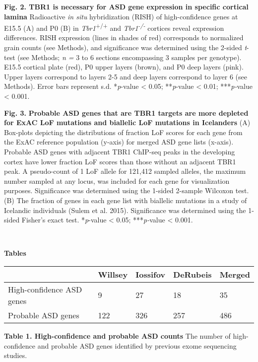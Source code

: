 \documentclass[]{article}
\begin{document}
\textbf{Fig. 2. TBR1 is necessary for ASD gene expression in specific
cortical lamina} Radioactive \emph{in situ} hybridization (RISH) of
high-confidence genes at E15.5 (A) and P0 (B) in
\emph{Tbr1}\textsuperscript{+/+} and \emph{Tbr1\textsuperscript{-/-}}
cortices reveal expression differences. RISH expression (lines in shades
of red) corresponds to normalized grain counts (see Methods), and
significance was determined using the 2-sided \emph{t}-test (see
Methods; \emph{n =} 3 to 6 sections encompassing 3 samples per
genotype). E15.5 cortical plate (red), P0 upper layers (brown), and P0
deep layers (pink). Upper layers correspond to layers 2-5 and deep
layers correspond to layer 6 (see Methods). Error bars represent s.d.
*\emph{p}-value \textless{} 0.05; **\emph{p}-value \textless{} 0.01;
***\emph{p-}value \textless{} 0.001.

\textbf{Fig. 3.} \textbf{Probable ASD genes that are TBR1 targets are
more depleted for ExAC LoF mutations and biallelic LoF mutations in
Icelanders} (A) Box-plots depicting the distributions of fraction LoF
scores for each gene from the ExAC reference population (y-axis) for
merged ASD gene lists (x-axis). Probable ASD genes with adjacent TBR1
ChIP-seq peaks in the developing cortex have lower fraction LoF scores
than those without an adjacent TBR1 peak. A pseudo-count of 1 LoF allele
for 121,412 sampled alleles, the maximum number sampled at any locus,
was included for each gene for visualization purposes. Significance was
determined using the 1-sided 2-sample Wilcoxon test. (B) The fraction of
genes in each gene list with biallelic mutations in a study of Icelandic
individuals (Sulem et al. 2015). Significance was determined using the
1-sided Fisher's exact test. *\emph{p}-value \textless{} 0.05;
***\emph{p-}value \textless{} 0.001.

\textbf{\\
}

\textbf{Tables}

\begin{longtable}[]{@{}lllll@{}}
\toprule
~ & Willsey & Iossifov & DeRubeis & Merged\tabularnewline
\midrule
\endhead
High-confidence ASD genes & 9 & 27 & 18 & 35\tabularnewline
Probable ASD genes & 122 & 326 & 257 & 486\tabularnewline
\bottomrule
\end{longtable}

\textbf{Table 1. High-confidence and probable ASD counts} The number of
high-confidence and probable ASD genes identified by previous exome
sequencing studies.
\end{document}
